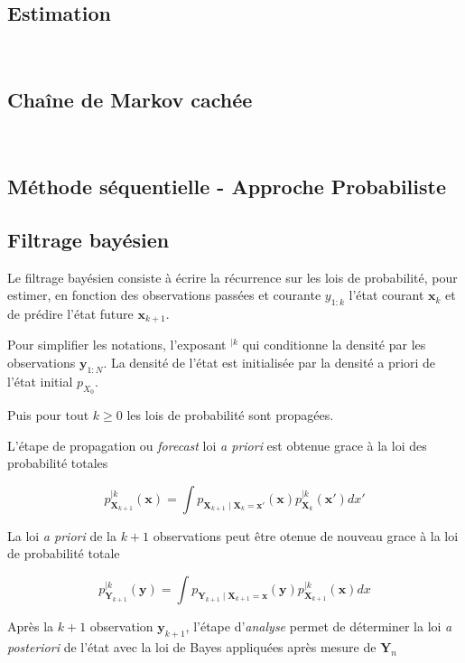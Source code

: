 \subsection{Estimation}~\label{estimation}

\subsection{Chaîne de Markov cachée}~\label{hidden_mc}

\subsection{Méthode séquentielle - Approche Probabiliste}


\subsection{Filtrage bayésien}

Le filtrage bayésien consiste à écrire la récurrence sur les lois de probabilité, pour estimer, en fonction des observations passées et courante $y_{1:k}$ l'état courant $\bm x_k$ et de prédire l'état future $\bm x_{k+1}$.

Pour simplifier les notations, l'exposant $^{\mid k}$ qui conditionne la densité par les observations $\bm y_{1:N}$.
La densité de l'état est initialisée par la densité a priori de l'état initial $p_{X_0}$.

Puis pour tout $k \geq 0$ les lois de probabilité sont propagées.

L'étape de propagation ou \textit{forecast} loi \textit{a priori} est obtenue grace à la loi des probabilité totales

\begin{equation}\label{tot_rule}
    p_{\bm X_{k+1}}^{\mid k}(\bm x)= \int p_{\bm X_{k+1}\mid \bm X_{k} = \bm x'}(\bm x) p_{\bm X_{k}}^{\mid k}(\bm x')dx'
\end{equation}

La loi \textit{a priori} de la $k+1$ observations peut être otenue de nouveau grace à la loi de probabilité totale

\begin{equation*}
    p_{\bm Y_{k+1}}^{\mid k}(\bm y) = \int p_{\bm Y_{k+1}\mid \bm X_{k+1} = \bm x}(\bm y) p_{\bm X_{k+1}}^{\mid k}(\bm x)dx
\end{equation*}

Après la $k+1$ observation $\bm y_{k+1}$, l'étape d'\textit{analyse} permet de déterminer la loi \textit{a posteriori} de l'état
avec la loi de Bayes appliquées après mesure de $\bm Y_n$


